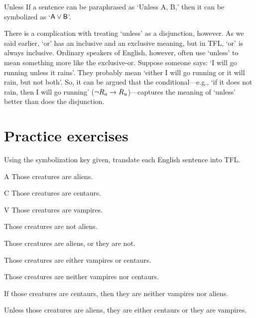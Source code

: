 \begin{factboxy}{Unless}
		If a sentence can be paraphrased as `Unless A, B,' then it can be symbolized as `$\mathsf{A}\vee\mathsf{B}$'.
\end{factboxy}

There is a complication with treating `unless' as a disjunction, however. As we said earlier, `or' has an inclusive and an exclusive meaning, but in TFL, `or' is always inclusive. Ordinary speakers of English, however, often use `unless' to mean something more like the exclusive-or. Suppose someone says: `I will go running unless it rains'. They probably mean `either I will go running or it will rain, but not both'. So, it can be argued that the conditional---e.g., `if it does not rain, then I will go running' (${\neg} R_a \rightarrow R_u$)---captures the meaning of `unless' better than does the disjunction.



\filbreak
\section{Practice exercises}
\setcounter{ProbPart}{0}

\problempart Using the symbolization key given, translate each English sentence into TFL.\label{pr.monkeysuits}
	\begin{ekey}
		\item[A] Those creatures are aliens. 
		\item[C] Those creatures are centaurs. 
		\item[V] Those creatures are vampires.
	\end{ekey}
\begin{earg}
\item Those creatures are not aliens.
\item Those creatures are aliens, or they are not.
\item Those creatures are either vampires or centaurs.
\item Those creatures are neither vampires nor centaurs.
\item If those creatures are centaurs, then they are neither vampires nor aliens.
\item Unless those creatures are aliens, they are either centaurs or they are vampires.
\end{earg}

